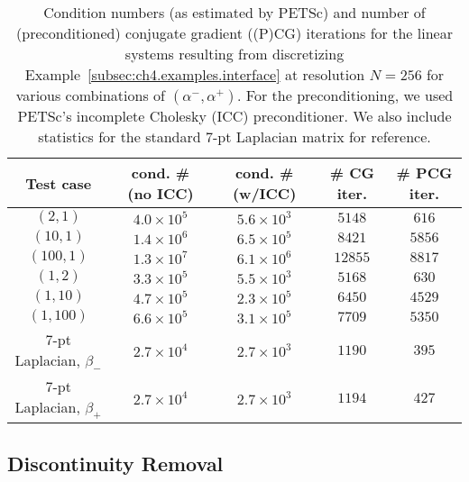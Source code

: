 \begin{table}[htbp]
\begin{center}
\begin{tabular}{|c|c|c|c|c|}
\hline
Test case & cond. \# (no ICC) & cond. \# (w/ICC) & \# CG iter. & \# PCG iter. \\
\hline
$(2,1)$ & $4.0 \times 10^5$ & $5.6 \times 10^3$ & $5148$ & $616$ \\
\hline
$(10,1)$ & $1.4 \times 10^6$ & $6.5 \times 10^5$ & $8421$ & $5856$ \\
\hline
$(100,1)$ & $1.3 \times 10^7$ & $6.1 \times 10^6$ & $12855$ & $8817$ \\
\hline
$(1,2)$ & $3.3 \times 10^5$ & $5.5 \times 10^3$ & $5168$ & $630$ \\
\hline
$(1,10)$ & $4.7 \times 10^5$ & $2.3 \times 10^5$ & $6450$ & $4529$ \\
\hline
$(1,100)$ & $6.6 \times 10^5$ & $3.1 \times 10^5$ & $7709$ & $5350$ \\
\hline
$7$-pt Laplacian, $\beta_-$ & $2.7 \times 10^4$ & $2.7 \times 10^3$ & $1190$ & $395$ \\
\hline
$7$-pt Laplacian, $\beta_+$ & $2.7 \times 10^4$ & $2.7 \times 10^3$ & $1194$ & $427$ \\
\hline
\end{tabular}
\end{center}
\caption{Condition numbers (as estimated by PETSc) and number of (preconditioned) conjugate gradient ((P)CG) iterations for the linear systems resulting from discretizing Example~\ref{subsec:ch4.examples.interface} at resolution $N = 256$ for various combinations of $(\alpha^-, \alpha^+)$. For the preconditioning, we used PETSc's incomplete Cholesky (ICC) preconditioner. We also include statistics for the standard $7$-pt Laplacian matrix for reference.}
\label{tab:ch4.examples.interface}
\end{table} 

\subsection{Discontinuity Removal} \label{subsubsec:ch4.example.interface.discontinuityremoval}

